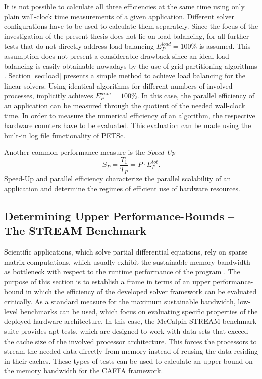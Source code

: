 It is not possible to calculate all three efficiencies at the same time using only plain wall-clock time measurements of a given application.  Different solver configurations have to be used to calculate them separately. Since the focus of the investigation of the present thesis does not lie on load balancing, for all further tests that do not directly address load balancing \(E^{load}_P = 100\%  \) is assumed. This assumption does not present a considerable drawback since an ideal load balancing is easily obtainable nowadays by the use of grid partitioning algorithms \cite{ferziger02}. Section \ref{sec:load} presents a simple method to achieve load balancing for the linear solvers. Using identical algorithms for different numbers of involved processes, implicitly achieves \(E^{num}_P = 100 \%\). In this case, the parallel efficiency of an application can be measured through the quotient of the needed wall-clock time. In order to measure the numerical efficiency of an algorithm, the respective hardware counters have to be evaluated. This evaluation can be made using the built-in log file functionality of PETSc. 

Another common performance measure is the \emph{Speed-Up}
\begin{displaymath}
  S_P = \frac{T_1}{T_P} = P \cdot E^{tot}_P.
\end{displaymath}
Speed-Up and parallel efficiency characterize the parallel scalability of an application and determine the regimes of efficient use of hardware resources.

\subsection{Determining Upper Performance-Bounds -- The STREAM Benchmark}

Scientific applications, which solve partial differential equations, rely on sparse matrix computations, which usually exhibit the sustainable memory bandwidth as bottleneck with respect to the runtime performance of the program \cite{hager11}. The purpose of this section is to establish a frame in terms of an upper performance-bound in which the efficiency of the developed solver framework can be evaluated critically. As a standard measure for the maximum sustainable bandwidth, low-level benchmarks can be used, which focus on evaluating specific properties of the deployed hardware architecture. In this case, the McCalpin STREAM benchmark suite \cite{mccalpin07,mccalpin95} provides apt tests, which are designed to work with data sets that exceed the cache size of the involved processor architecture. This forces the processors to stream the needed data directly from memory instead of reusing the data residing in their caches. These types of tests can be used to calculate an upper bound on the memory bandwidth for the CAFFA framework.

